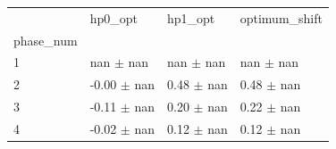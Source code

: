 \begin{tabular}{llll}
\toprule
 & hp0_opt & hp1_opt & optimum_shift \\
phase_num &  &  &  \\
\midrule
1 & nan $\pm$ nan & nan $\pm$ nan & nan $\pm$ nan \\
2 & -0.00 $\pm$ nan & 0.48 $\pm$ nan & 0.48 $\pm$ nan \\
3 & -0.11 $\pm$ nan & 0.20 $\pm$ nan & 0.22 $\pm$ nan \\
4 & -0.02 $\pm$ nan & 0.12 $\pm$ nan & 0.12 $\pm$ nan \\
\bottomrule
\end{tabular}
